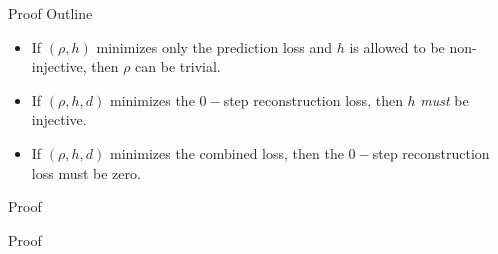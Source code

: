 \documentclass{beamer}
\begin{document}
\begin{frame}{Proof Outline}
  \begin{itemize}
  \item If $(\rho, h)$ minimizes only the prediction loss and $h$ is allowed to be non-injective, then $\rho$ can be trivial.
  \item If $(\rho, h, d)$ minimizes the $0-$step reconstruction loss, then $h$ \textit{must} be injective.
  \item If $(\rho, h, d)$ minimizes the combined loss, then the $0-$step reconstruction loss must be zero.
  \end{itemize}
  
\end{frame}
\begin{frame}{Proof}
  
\end{frame}
\begin{frame}{Proof}
  
\end{frame}
\end{document}
